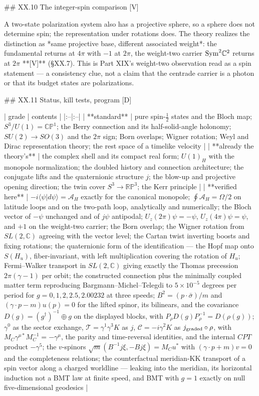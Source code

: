 ## XX.10 The integer-spin comparison [V]

A two-state polarization system also has a projective sphere, so a sphere does not determine spin; the representation under rotations does. The theory realizes the distinction as *same projective base, different associated weight*: the fundamental returns at $4\pi$ with $-1$ at $2\pi$, the weight-two carrier ${\rm Sym}^2\mathbb C^2$ returns at $2\pi$ **[V]** (§XX.7). This is Part XIX's weight-two observation read as a spin statement — a consistency clue, not a claim that the centrade carrier is a photon or that its budget states are polarizations.

## XX.11 Status, kill tests, program [D]

| grade | contents |
|:--|:--|
| **standard** | pure spin-$\tfrac12$ states and the Bloch map; $S^3/U(1) = \mathbb{CP}^1$; the Berry connection and its half-solid-angle holonomy; $SU(2)\to SO(3)$ and the $2\pi$ sign; Born overlaps; Wigner rotation; Weyl and Dirac representation theory; the rest space of a timelike velocity |
| **already the theory's** | the complex shell and its compact real form; $U(1)_H$ with the monopole normalization; the doubled history and connection architecture; the conjugate lifts and the quaternionic structure $j$; the blow-up and projective opening direction; the twin cover $S^3\to\mathbb{RP}^3$; the Kerr principle |
| **verified here** | $-i\langle\psi\vert d\psi\rangle = \mathcal A_H$ exactly for the canonical monopole; $\oint\mathcal A_H = \Omega/2$ on latitude loops and on the two-path loop, analytically and numerically; the Bloch vector of $-\psi$ unchanged and of $j\psi$ antipodal; $U_z(2\pi)\psi = -\psi$, $U_z(4\pi)\psi = \psi$, and $+1$ on the weight-two carrier; the Born overlap; the Wigner rotation from $SL(2,\mathbb C)$ agreeing with the vector level; the Cartan twist inverting boosts and fixing rotations; the quaternionic form of the identification — the Hopf map onto $S(H_u)$, fiber-invariant, with left multiplication covering the rotation of $H_u$; Fermi–Walker transport in $SL(2,\mathbb C)$ giving exactly the Thomas precession $2\pi(\gamma-1)$ per orbit; the constructed connection plus the minimally coupled matter term reproducing Bargmann–Michel–Telegdi to $5\times10^{-5}$ degrees per period for $g = 0, 1, 2, 2.5, 2.00232$ at three speeds; $B^2 = (p\cdot\bar\sigma)/m$ and $(\gamma\cdot p-m)u(p) = 0$ for the lifted spinor, its bilinears, and the covariance $D(g) = (g^\dagger)^{-1}\oplus g$ on the displayed blocks, with $P_\rho D(g)P_\rho^{-1} = D(\rho(g))$; $\gamma^0$ as the sector exchange, $\mathcal T = \gamma^1\gamma^3K$ as $j$, $\mathcal C = -i\gamma^2K$ as $j_{\rm graded}\circ\rho$, with $M_C\gamma^{\mu*}M_C^{-1} = -\gamma^\mu$, the parity and time-reversal identities, and the internal $CPT$ product $-\gamma^5$; the $v$-spinors $\sqrt m(B^{-1}j\xi,-Bj\xi) = M_Cu^*$ with $(\gamma\cdot p+m)v = 0$ and the completeness relations; the counterfactual meridian-KK transport of a spin vector along a charged worldline — leaking into the meridian, its horizontal induction not a BMT law at finite speed, and BMT with $g = 1$ exactly on null five-dimensional geodesics |
